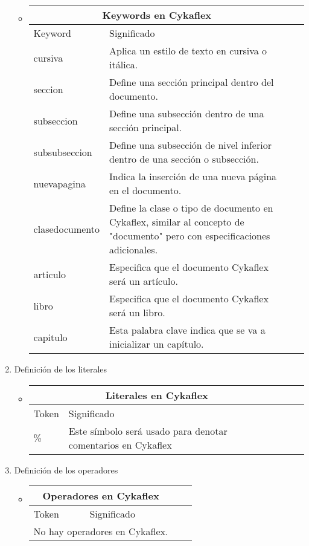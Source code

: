 \documentclass[12pt]{article}
\begin{document}
\begin{enumerate}
\begin{itemize}
            \newpage
            \item \begin{tabular}{ |p{6cm}||p{8cm}|p{3cm}|p{3cm}|  }
            \hline
            \multicolumn{2}{|c|}{Keywords en Cykaflex} \\
            \hline  Keyword& Significado\\ 
            \hline cursiva & Aplica un estilo de texto en cursiva o itálica.\\
            \hline seccion & Define una sección principal dentro del documento.\\
            \hline subseccion & Define una subsección dentro de una sección principal.\\
            \hline subsubseccion & Define una subsección de nivel inferior dentro de una sección o subsección.\\
            \hline nuevapagina & Indica la inserción de una nueva página en el documento.\\
            \hline clasedocumento & Define la clase o tipo de documento en Cykaflex, similar al concepto de "documento" pero con especificaciones adicionales.\\
            \hline articulo & Especifica que el documento Cykaflex será un artículo.\\
            \hline libro & Especifica que el documento Cykaflex será un libro. \\
            \hline capitulo & Esta palabra clave indica que se va a inicializar un capítulo. \\
            \hline
            \end{tabular}
        \end{itemize}
    \item Definición de los literales
        \begin{itemize}
            \item \begin{tabular}{ |p{6cm}||p{8cm}|p{3cm}|p{3cm}|  }
            \hline
            \multicolumn{2}{|c|}{Literales en Cykaflex} \\
            \hline  Token& Significado\\ 
            \hline
            \%   & Este símbolo será usado para denotar comentarios en Cykaflex\\
            \hline
            \end{tabular}
        \end{itemize}
    \item Definición de los operadores
        \begin{itemize}
            \item \begin{tabular}{ |p{6cm}||p{8cm}|p{3cm}|p{3cm}|  }
            \hline
            \multicolumn{2}{|c|}{Operadores en Cykaflex} \\
            \hline  Token& Significado\\ 
            \hline
            \multicolumn{2}{|c|}{No hay operadores en Cykaflex.}\\
            \hline
            \end{tabular}
        \end{itemize}
\end{enumerate}
\end{document}
